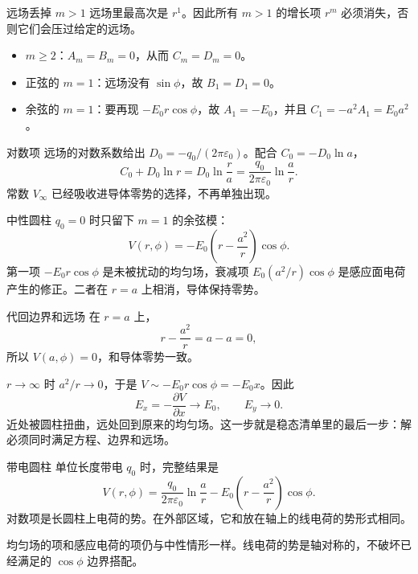 \documentclass[fontset=windows, chinese, 10pt, xcolor=dvipsnames]{beamer}
\begin{document}
\begin{frame}{远场丢掉 $m>1$}
  远场里最高次是 $r^1$。因此所有 $m>1$ 的增长项 $r^{m}$ 必须消失，否则它们会压过给定的远场。
  \begin{itemize}
    \item $m\geq 2$：$A_m=B_m=0$，从而 $C_m=D_m=0$。
    \item 正弦的 $m=1$：远场没有 $\sin\phi$，故 $B_1=D_1=0$。
    \item 余弦的 $m=1$：要再现 $-E_0 r\cos\phi$，故 $A_1=-E_0$，并且 $C_1=-a^2 A_1=E_0 a^2$。
  \end{itemize}
\end{frame}

\begin{frame}{对数项}
  远场的对数系数给出 $D_0=-q_0/(2\pi\varepsilon_0)$。配合 $C_0=-D_0\ln a$，
  \begin{equation*}
    C_0+D_0\ln r
    =D_0\ln\frac{r}{a}
    =\frac{q_0}{2\pi\varepsilon_0}\ln\frac{a}{r}.
  \end{equation*}
  常数 $V_{\infty}$ 已经吸收进导体零势的选择，不再单独出现。
\end{frame}

\begin{frame}{中性圆柱}
  $q_0=0$ 时只留下 $m=1$ 的余弦模：
  \begin{equation*}
    \boxed{V(r,\phi)
    =-E_0\left(r-\frac{a^2}{r}\right)\cos\phi.}
  \end{equation*}
  第一项 $-E_0 r\cos\phi$ 是未被扰动的均匀场，衰减项 $E_0(a^2/r)\cos\phi$ 是感应面电荷产生的修正。二者在 $r=a$ 上相消，导体保持零势。
\end{frame}

\begin{frame}{代回边界和远场}
  在 $r=a$ 上，
  \begin{equation*}
    r-\frac{a^2}{r}=a-a=0,
  \end{equation*}
  所以 $V(a,\phi)=0$，和导体零势一致。
  \vspace{0.4em}

  $r\to\infty$ 时 $a^2/r\to 0$，于是 $V\sim -E_0 r\cos\phi=-E_0 x$。因此
  \begin{equation*}
    E_x=-\frac{\partial V}{\partial x}\to E_0,
    \qquad E_y\to 0.
  \end{equation*}
  近处被圆柱扭曲，远处回到原来的均匀场。这一步就是稳态清单里的最后一步：解必须同时满足方程、边界和远场。
\end{frame}

\begin{frame}{带电圆柱}
  单位长度带电 $q_0$ 时，完整结果是
  \begin{equation*}
    V(r,\phi)
    =\frac{q_0}{2\pi\varepsilon_0}\ln\frac{a}{r}
    -E_0\left(r-\frac{a^2}{r}\right)\cos\phi.
  \end{equation*}
  对数项是长圆柱上电荷的势。在外部区域，它和放在轴上的线电荷的势形式相同。
  \vspace{0.3em}

  均匀场的项和感应电荷的项仍与中性情形一样。线电荷的势是轴对称的，不破坏已经满足的 $\cos\phi$ 边界搭配。
\end{frame}
\end{document}
